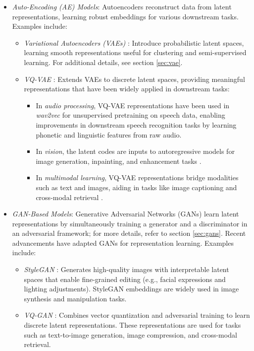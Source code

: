 \begin{itemize}
    \item \emph{Auto-Encoding (AE) Models}: Autoencoders reconstruct data from latent representations, learning robust embeddings for various downstream tasks. Examples include:
    \begin{itemize}
        \item \emph{Variational Autoencoders (VAEs)} \citep{kingma2013auto}: Introduce probabilistic latent spaces, learning smooth representations useful for clustering and semi-supervised learning. For additional details, see section \ref{sec:vae}.
        \item \emph{VQ-VAE} \citep{oord2017neural}: Extends VAEs to discrete latent spaces, providing meaningful representations that have been widely applied in downstream tasks:
        \begin{itemize}
            \item In \textit{audio processing}, VQ-VAE representations have been used in \textit{wav2vec} \citep{baevski2020wav2vec} for unsupervised pretraining on speech data, enabling improvements in downstream speech recognition tasks by learning phonetic and linguistic features from raw audio.
            \item In \textit{vision}, the latent codes are inputs to autoregressive models for image generation, inpainting, and enhancement tasks \citep{razavi2019generating}.
            \item In \textit{multimodal learning}, VQ-VAE representations bridge modalities such as text and images, aiding in tasks like image captioning and cross-modal retrieval \citep{ding2021vqvae}.
        \end{itemize}
    \end{itemize}
    \item \emph{GAN-Based Models}: Generative Adversarial Networks (GANs) learn latent representations by simultaneously training a generator and a discriminator in an adversarial framework; for more details, refer to section \ref{sec:gans}. Recent advancements have adapted GANs for representation learning. Examples include:
    \begin{itemize}
        \item \emph{StyleGAN} \citep{karras2019style}: Generates high-quality images with interpretable latent spaces that enable fine-grained editing (e.g., facial expressions and lighting adjustments). StyleGAN embeddings are widely used in image synthesis and manipulation tasks.
        \item \emph{VQ-GAN} \citep{esser2021taming}: Combines vector quantization and adversarial training to learn discrete latent representations. These representations are used for tasks such as text-to-image generation, image compression, and cross-modal retrieval.
    \end{itemize}
\end{itemize}

